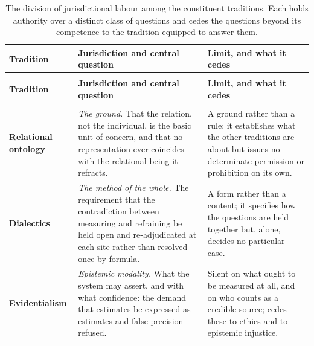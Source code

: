 \begin{small}
\renewcommand{\arraystretch}{1.35}
\begin{longtable}{@{}>{\raggedright\arraybackslash}p{} >{\raggedright\arraybackslash}p{} >{\raggedright\arraybackslash}p{}@{}}
\caption{The division of jurisdictional labour among the constituent traditions. Each holds authority over a distinct class of questions and cedes the questions beyond its competence to the tradition equipped to answer them.}\label{p01:tab:jurisdictions}\\
\toprule
\textbf{Tradition} & \textbf{Jurisdiction and central question} & \textbf{Limit, and what it cedes}\\
\midrule
\endfirsthead
\multicolumn{3}{@{}l}{\small\itshape Table~\ref{p01:tab:jurisdictions}, continued}\\
\toprule
\textbf{Tradition} & \textbf{Jurisdiction and central question} & \textbf{Limit, and what it cedes}\\
\midrule
\endhead
\midrule
\multicolumn{3}{r@{}}{\small\itshape continued on the next page}\\
\endfoot
\bottomrule
\endlastfoot

\textbf{Relational ontology} \parencite{huang2025relational, gergen2009relational, whitehead1978process, buber1937iandthou} & \emph{The ground.} That the relation, not the individual, is the basic unit of concern, and that no representation ever coincides with the relational being it refracts. & A ground rather than a rule; it establishes what the other traditions are about but issues no determinate permission or prohibition on its own.\\

\textbf{Dialectics} \parencite{hegel1807phenomenology, adorno1966negative} & \emph{The method of the whole.} The requirement that the contradiction between measuring and refraining be held open and re-adjudicated at each site rather than resolved once by formula. & A form rather than a content; it specifies how the questions are held together but, alone, decides no particular case.\\

\textbf{Evidentialism} \parencite{clifford1877ethics, feldman1985evidentialism} & \emph{Epistemic modality.} What the system may assert, and with what confidence: the demand that estimates be expressed as estimates and false precision refused. & Silent on what ought to be measured at all, and on who counts as a credible source; cedes these to ethics and to epistemic injustice.\\


\end{longtable}
\end{small}
